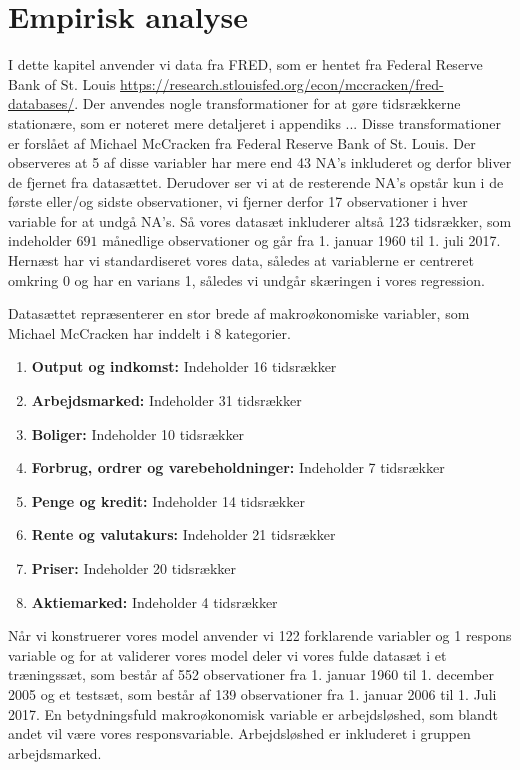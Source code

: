 \chapter{Empirisk analyse}
I dette kapitel anvender vi data fra FRED, som er hentet fra Federal Reserve Bank of St. Louis \url{https://research.stlouisfed.org/econ/mccracken/fred-databases/}.
Der anvendes nogle transformationer for at gøre tidsrækkerne stationære, som er noteret mere detaljeret i appendiks ... 
Disse transformationer er forslået af Michael McCracken fra Federal Reserve Bank of St. Louis.  
Der observeres at 5 af disse variabler har mere end 43 NA's inkluderet og derfor bliver de fjernet fra datasættet. 
Derudover ser vi at de resterende NA's opstår kun i de første eller/og sidste observationer, vi fjerner derfor 17 observationer i hver variable for at undgå NA's. 
Så vores datasæt inkluderer altså 123 tidsrækker, som indeholder $691$ månedlige observationer og går fra 1. januar 1960 til 1. juli 2017. 
Hernæst har vi standardiseret vores data, således at variablerne er centreret omkring 0 og har en varians 1, således vi undgår skæringen i vores regression. 

Datasættet repræsenterer en stor brede af makroøkonomiske variabler, som Michael McCracken har inddelt i 8 kategorier. 
\begin{enumerate}
\item \textbf{Output og indkomst:} Indeholder 16 tidsrækker
\item \textbf{Arbejdsmarked:}  Indeholder 31 tidsrækker
\item \textbf{Boliger:} Indeholder 10 tidsrækker
\item \textbf{Forbrug, ordrer og varebeholdninger:} Indeholder 7 tidsrækker
\item \textbf{Penge og kredit:} Indeholder 14 tidsrækker
\item\textbf{ Rente og valutakurs:} Indeholder 21 tidsrækker
\item \textbf{Priser:} Indeholder 20 tidsrækker
\item \textbf{Aktiemarked:} Indeholder 4 tidsrækker
\end{enumerate}

Når vi konstruerer vores model anvender vi 122 forklarende variabler og 1 respons variable og for at validerer vores model deler vi vores fulde datasæt i et træningssæt, som består af 552 observationer fra 1. januar 1960 til 1. december 2005 og et testsæt, som består af 139 observationer fra 1. januar 2006 til 1. Juli 2017. 
En betydningsfuld makroøkonomisk variable er arbejdsløshed, som blandt andet vil være vores responsvariable.  Arbejdsløshed er inkluderet i gruppen arbejdsmarked. 
